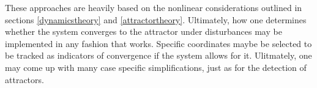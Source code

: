  These approaches are heavily based on the nonlinear considerations outlined in sections \ref{dynamicstheory} and \ref{attractortheory}. Ultimately, how one determines whether the system converges to the attractor under disturbances may be implemented in any fashion that works. Specific coordinates maybe be selected to be tracked as indicators of convergence if the system allows for it. Ulitmately, one may come up with many case specific simplifications, just as for the detection of attractors. 



  


 

    
    

    



